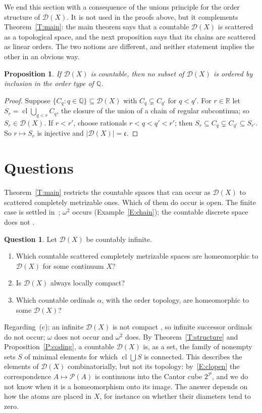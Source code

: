 \documentclass[11pt,reqno]{amsart}
\theoremstyle{plain}
\newtheorem{proposition}[theorem]{Proposition}
\theoremstyle{definition}
\newtheorem{question}[theorem]{Question}
\theoremstyle{remark}
\newcommand{\D}{\mathcal{D}}
\newcommand{\PP}{\mathcal{P}}
\newcommand{\cl}{\operatorname{cl}}
\newcommand{\Q}{\mathbb{Q}}
\newcommand{\R}{\mathbb{R}}
\newcommand{\cc}{\mathfrak{c}}
\begin{document}
We end this section with a consequence of the unions principle for the order structure of $\D(X)$. It is not used in the proofs above, but it complements Theorem~\ref{T:main}: the main theorem says that a countable $\D(X)$ is scattered as a topological space, and the next proposition says that its chains are scattered as linear orders. The two notions are different, and neither statement implies the other in an obvious way.

\begin{proposition}\label{P:chains}
If $\D(X)$ is countable, then no subset of $\D(X)$ is ordered by inclusion in the order type of $\Q$.
\end{proposition}

\begin{proof}
Suppose $\{C_q:q\in\Q\}\subseteq\D(X)$ with $C_q\subsetneq C_{q'}$ for $q<q'$. For $r\in\R$ let $S_r=\cl\bigcup_{q<r}C_q$, the closure of the union of a chain of regular subcontinua; so $S_r\in\D(X)$. If $r<r'$, choose rationals $r<q<q'<r'$; then $S_r\subseteq C_q\subsetneq C_{q'}\subseteq S_{r'}$. So $r\mapsto S_r$ is injective and $|\D(X)|=\cc$.
\end{proof}

\section{Questions}\label{S:questions}

Theorem~\ref{T:main} restricts the countable spaces that can occur as $\D(X)$ to scattered completely metrizable ones. Which of them do occur is open. The finite case is settled in~\cite{CORa,AdAfin}; $\omega^2$ occurs (Example~\ref{E:chain}); the countable discrete space does not \cite[Theorem~3.25]{CORa}.

\begin{question}\label{Q:which}
Let $\D(X)$ be countably infinite.
\begin{enumerate}[label=\textup{(\alph*)}]
\item Which countable scattered completely metrizable spaces are homeomorphic to $\D(X)$ for some continuum $X$?
\item Is $\D(X)$ always locally compact?
\item Which countable ordinals $\alpha$, with the order topology, are homeomorphic to some $\D(X)$?
\end{enumerate}
\end{question}

Regarding~(c): an infinite $\D(X)$ is not compact \cite[Corollary~4.13]{Ord18}, so infinite successor ordinals do not occur; $\omega$ does not occur and $\omega^2$ does. By Theorem~\ref{T:structure} and Proposition~\ref{P:coding}, a countable $\D(X)$ is, as a set, the family of nonempty sets $S$ of minimal elements for which $\cl\bigcup S$ is connected. This describes the elements of $\D(X)$ combinatorially, but not its topology: by~\eqref{E:clopen} the correspondence $A\mapsto\PP(A)$ is continuous into the Cantor cube $2^{\PP}$, and we do not know when it is a homeomorphism onto its image. The answer depends on how the atoms are placed in $X$, for instance on whether their diameters tend to zero.
\end{document}

